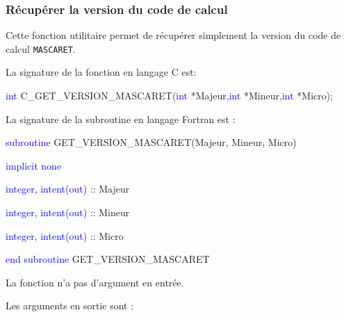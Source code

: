 \documentclass[a4paper,11pt]{article}
\begin{document}
\subsubsection{R\'ecup\'erer la version du code de calcul}

 Cette fonction utilitaire permet de r\'ecup\'erer simplement la version du code de calcul \texttt{MASCARET}.
 
 \vspace{0.5cm}
 
 La signature de la fonction en langage C est:
 
 \vspace{0.5cm}
 
 \textcolor{blue}{int} C\_GET\_VERSION\_MASCARET(\textcolor{blue}{int} *Majeur,\textcolor{blue}{int} *Mineur,\textcolor{blue}{int} *Micro);
 
  \vspace{0.5cm} 
 
  La signature de la subroutine en langage Fortran est :
 
 \vspace{0.5cm}
 
    \textcolor{blue}{subroutine} GET\_VERSION\_MASCARET(Majeur, Mineur, Micro)
    
        \hspace{1cm}\textcolor{blue}{implicit none}                 
        
        \hspace{1cm} \textcolor{blue}{integer, intent(out)} :: Majeur
        
        \hspace{1cm} \textcolor{blue}{integer, intent(out)} :: Mineur
        
        \hspace{1cm} \textcolor{blue}{integer, intent(out)} :: Micro
        
    \textcolor{blue}{end subroutine} GET\_VERSION\_MASCARET
    
 \vspace{0.5cm}
 
 La fonction n'a pas d'argument en entr\'ee.
 
 \vspace{0.5cm}
 
  Les arguments en sortie sont :

  \vspace{0.5cm}
\end{document}
